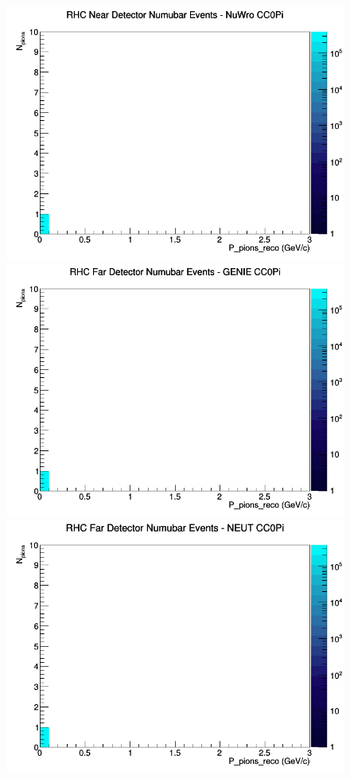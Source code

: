 \documentclass[12pt]{article}
\begin{document}
\begin{figure}[h]
\includegraphics[width=\linewidth]{eff_N_P/FGT/pions/CC0Pi_RHC_ND_numubar_N_P_NuWro.png}
\endminipage
\newline
{}
\includegraphics[width=\linewidth]{eff_N_P/FGT/pions/CC0Pi_RHC_FD_numubar_N_P_GENIE.png}
\endminipage
{}
\includegraphics[width=\linewidth]{eff_N_P/FGT/pions/CC0Pi_RHC_FD_numubar_N_P_NEUT.png}

\end{figure}
\end{document}
